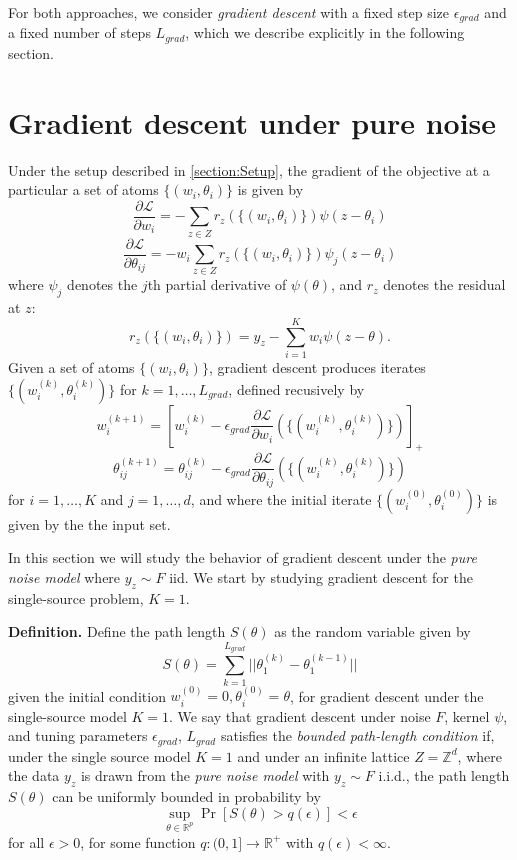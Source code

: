 \documentclass[11pt]{article}
\begin{document}
For both approaches, we consider \emph{gradient descent} with a fixed
step size $\epsilon_{grad}$ and a fixed number of steps $L_{grad}$, which we
describe explicitly in the following section.

\section{Gradient descent under pure noise}

Under the setup described in \ref{section:Setup},
the gradient of the objective at a particular a set of atoms $\{(w_i, \theta_i)\}$
is given by
\[
\frac{\partial \mathcal{L}}{\partial w_i} = -\sum_{z \in Z} r_z(\{(w_i, \theta_i)\}) \psi(z - \theta_i)
\]
\[
\frac{\partial \mathcal{L}}{\partial \theta_{ij}} = -w_i\sum_{z \in Z} r_z(\{(w_i, \theta_i)\}) \psi_j(z - \theta_i)
\]
where $\psi_j$ denotes the $j$th partial derivative of $\psi(\theta)$, and $r_z$ denotes the residual at $z$:
\[
r_z(\{(w_i, \theta_i)\}) = y_z - \sum_{i=1}^K w_i \psi(z - \theta).
\]
Given a set of atoms $\{(w_i, \theta_i)\}$, gradient descent produces iterates
$\{(w_i^{(k)}, \theta_i^{(k)})\}$ for $k = 1,\hdots, L_{grad}$,
defined recusively by
\[
w_i^{(k + 1)} = \left[w_i^{(k)} - \epsilon_{grad} \frac{\partial \mathcal{L}}{\partial w_i}(\{(w_i^{(k)}, \theta_i^{(k)})\})\right]_+
\]
\[
\theta_{ij}^{(k + 1)} = \theta_{ij}^{(k)} - \epsilon_{grad} \frac{\partial \mathcal{L}}{\partial \theta_{ij}}(\{(w_i^{(k)}, \theta_i^{(k)})\})
\]
for $i = 1,\hdots, K$ and $j=1,\hdots, d$, and where the initial iterate $\{(w_i^{(0)},
\theta_i^{(0)})\}$ is given by the the input set.

In this section we will study the behavior of gradient descent under the \emph{pure noise model} where $y_z \sim F$ iid.
We start by studying gradient descent for the single-source problem, $K=1$.

\textbf{Definition. }  Define the path length $S(\theta)$ as the random variable given by
\[
S(\theta) = \sum_{k=1}^{L_{grad}} ||\theta_1^{(k)} - \theta_1^{(k - 1)}||
\]
given the initial condition $w_i^{(0)} = 0, \theta_i^{(0)} = \theta$,
for gradient descent under the single-source model $K=1$.  We say that
gradient descent under noise $F$, kernel $\psi$, and tuning parameters
$\epsilon_{grad}$, $L_{grad}$ satisfies the \emph{bounded path-length
  condition} if, under the single source model $K=1$ and under an
infinite lattice $Z = \mathbb{Z}^d$, where the data $y_z$ is drawn
from the \emph{pure noise model} with $y_z \sim F$ i.i.d., the path
length $S(\theta)$ can be uniformly bounded in probability by
\[
\sup_{\theta \in \mathbb{R}^p} \Pr[S(\theta) > q(\epsilon)] < \epsilon
\]
for all $\epsilon > 0$, for some function $q: (0, 1] \to
  \mathbb{R}^+$ with $q(\epsilon) < \infty$.
\end{document}

